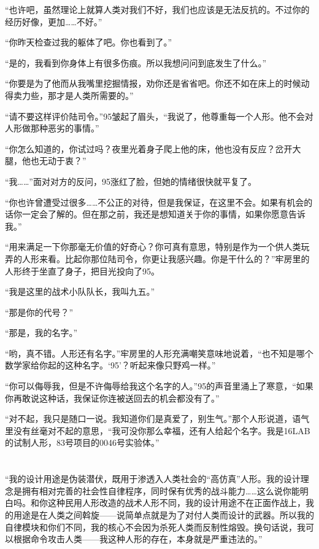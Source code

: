 “也许吧，虽然理论上就算人类对我们不好，我们也应该是无法反抗的。不过你的经历好像，更加……不好。”

“你昨天检查过我的躯体了吧。你也看到了。”

“是的，我看到你身体上有很多伤痕。所以我想问问到底发生了什么。”

“你要是为了他而从我嘴里挖掘情报，劝你还是省省吧。你还不如在床上的时候动得卖力些，那才是人类所需要的。”

“请不要这样评价陆司令。”95皱起了眉头，“我说了，他尊重每一个人形。他不会对人形做那种恶劣的事情。”

“你怎么知道的，你试过吗？夜里光着身子爬上他的床，他也没有反应？岔开大腿，他也无动于衷？”

“我……”面对对方的反问，95涨红了脸，但她的情绪很快就平复了。

“你也许曾遭受过很多……不公正的对待，但是我保证，在这里不会。如果有机会的话你一定会了解的。但在那之前，我还是想知道关于你的事情，如果你愿意告诉我。”

“用来满足一下你那毫无价值的好奇心？你可真有意思，特别是作为一个供人类玩弄的人形来看。比起你那位陆司令，你更让我感兴趣。你是干什么的？”牢房里的人形终于坐直了身子，把目光投向了95。

“我是这里的战术小队队长，我叫九五。”

“那是你的代号？”

“那是，我的名字。”

“哟，真不错。人形还有名字。”牢房里的人形充满嘲笑意味地说着，“也不知是哪个数学家给你起的这种名字。‘95’？听起来像只野鸡一样。”

“你可以侮辱我，但是不许侮辱给我这个名字的人。”95的声音里涌上了寒意，“如果你再敢说这种话，我保证你连被送回去的机会都没有了。”

“对不起，我只是随口一说。我知道你们是真爱了，别生气。”那个人形说道，语气里没有丝毫对不起的意思，“我可没你那么幸福，还有人给起个名字。我是16LAB的试制人形，83号项目的0046号实验体。”

\section*{}

“我的设计用途是伪装潜伏，既用于渗透入人类社会的“高仿真”人形。我的设计理念是拥有相对完善的社会性自律程序，同时保有优秀的战斗能力……这么说你能明白吗。和你这种民用人形改造的战术人形不同，我的设计用途不在正面作战上，我的用途是在人类之间斡旋——说简单点就是为了对付人类而设计的武器。所以我的自律模块和你们不同，我的核心不会因为杀死人类而反制性熔毁。换句话说，我可以根据命令攻击人类——我这种人形的存在，本身就是严重违法的。”

